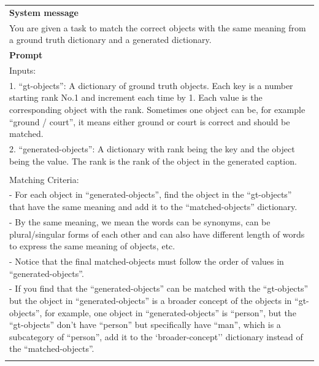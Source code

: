 \begin{table}[h!]\centering
\begin{minipage}{0.95\textwidth}   
\centering
\begin{tcolorbox} 
    \centering

      \small
    \begin{tabular}{p{}}
   { {\bf System message} } \\
You are given a task to match the correct objects with the same meaning from a ground truth dictionary and a generated dictionary. \\
    \midrule
    {\bf Prompt}  \\
        
       Inputs:\\
        1. ``gt-objects'': A dictionary of ground truth objects. Each key is a number starting rank No.1 and increment each time by 1. Each value is the corresponding object with the rank. 
        Sometimes one object can be, for example ``ground / court'', it means either ground or court is correct and should be matched.  \\
        2. ``generated-objects'': A dictionary with rank being the key and the object being the value. The rank is the rank of the object in the generated caption.\\\\


        Matching Criteria:\\
        - For each object in ``generated-objects'', find the object in the ``gt-objects'' that have the same meaning and add it to the ``matched-objects'' dictionary. \\
        - By the same meaning, we mean the words can be synonyms, can be plural/singular forms of each other and can also have different length of words to express the same meaning of objects, etc. \\
        - Notice that the final matched-objects must follow the order of values in ``generated-objects''. \\
        - If you find that the ``generated-objects'' can be matched with the ``gt-objects'' but the object in ``generated-objects'' is a broader concept of the objects in ``gt-objects'', for example, one object in ``generated-objects'' is ``person'', but the ``gt-objects'' don't have ``person'' but specifically have ``man'', which is a subcategory of ``person'', add it to the `broader-concept'' dictionary instead of the ``matched-objects''.\\\\
        

\end{tabular}
\end{tcolorbox}
\end{minipage}
\end{table}

